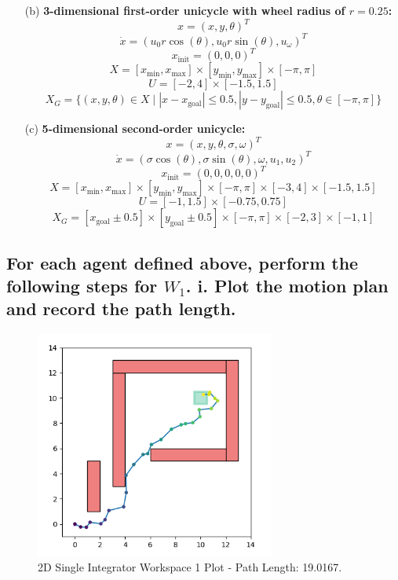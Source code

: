 \documentclass{article}
\begin{document}
{\begin{itemize}
\[    \]
    \[
    U = [-1.5, 3] \times [-1.5, 3]
    \]
    \[
    X_G = \{x \in X \mid \|x_{\text{goal}} - x\|_2 \leq 0.5\}
    \]
    \item[(b)] \textbf{3-dimensional first-order unicycle with wheel radius of \( r = 0.25 \):}
    \[
    x = (x, y, \theta)^T
    \]
    \[
    \dot{x} = (u_0 r \cos(\theta), u_0 r \sin(\theta), u_\omega)^T
    \]
    \[
    x_{\text{init}} = (0, 0, 0)^T
    \]
    \[
    X = [x_{\min}, x_{\max}] \times [y_{\min}, y_{\max}] \times [-\pi, \pi]
    \]
    \[
    U = [-2, 4] \times [-1.5, 1.5]
    \]
    \[
    X_G = \{(x, y, \theta) \in X \mid |x - x_{\text{goal}}| \leq 0.5, |y - y_{\text{goal}}| \leq 0.5, \theta \in [-\pi, \pi]\}
    \]
    \item[(c)] \textbf{5-dimensional second-order unicycle:}
    \[
    x = (x, y, \theta, \sigma, \omega)^T
    \]
    \[
    \dot{x} = (\sigma \cos(\theta), \sigma \sin(\theta), \omega, u_1, u_2)^T
    \]
    \[
    x_{\text{init}} = (0, 0, 0, 0, 0)^T
    \]
    \[
    X = [x_{\min}, x_{\max}] \times [y_{\min}, y_{\max}] \times [-\pi, \pi] \times [-3, 4] \times [-1.5, 1.5]
    \]
    \[
    U = [-1, 1.5] \times [-0.75, 0.75]
    \]
    \[
    X_G = [x_{\text{goal}} \pm 0.5] \times [y_{\text{goal}} \pm 0.5] \times [-\pi, \pi] \times [-2, 3] \times [-1, 1]
    \]
\end{itemize}
}

\subsection*{For each agent defined above, perform the following steps for \(W_1\).
i. Plot the motion plan and record the path length.}

\begin{figure}[H]
    \centering
    \includegraphics[width=0.7\textwidth]{1di0.png} 
    \caption{2D Single Integrator Workspace 1 Plot - Path Length: 19.0167.}
    \label{fig:1di0}
\end{figure}
\end{document}
